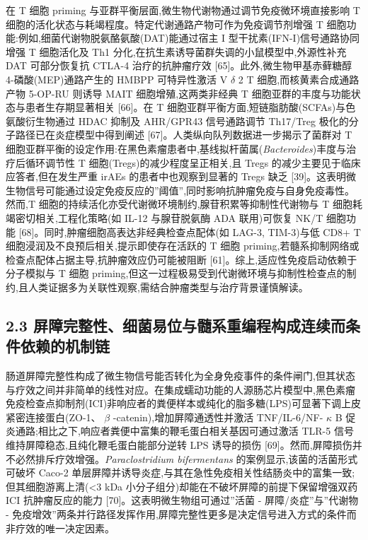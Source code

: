 \documentclass[11pt]{article}
\begin{document}
在 T 细胞 priming 与亚群平衡层面,微生物代谢物通过调节免疫微环境直接影响 T 细胞的活化状态与耗竭程度。特定代谢通路产物可作为免疫调节剂增强 T 细胞功能:例如,细菌代谢物脱氨酪氨酸(DAT)能通过宿主 I 型干扰素(IFN-I)信号通路协同增强 T 细胞活化及 Th1 分化,在抗生素诱导菌群失调的小鼠模型中,外源性补充 DAT 可部分恢复抗 CTLA-4 治疗的抗肿瘤疗效 {[}65{]}。此外,微生物甲基赤藓糖醇 4-磷酸(MEP)通路产生的 HMBPP 可特异性激活 V \(\delta\) 2 T 细胞,而核黄素合成通路产物 5-OP-RU 则诱导 MAIT 细胞增殖,这两类非经典 T 细胞亚群的丰度与功能状态与患者生存期显著相关 {[}66{]}。在 T 细胞亚群平衡方面,短链脂肪酸(SCFAs)与色氨酸衍生物通过 HDAC 抑制及 AHR/GPR43 信号通路调节 Th17/Treg 极化的分子路径已在炎症模型中得到阐述 {[}67{]}。人类纵向队列数据进一步揭示了菌群对 T 细胞亚群平衡的设定作用:在黑色素瘤患者中,基线拟杆菌属(\emph{Bacteroides})丰度与治疗后循环调节性 T 细胞(Tregs)的减少程度呈正相关,且 Tregs 的减少主要见于临床应答者,但在发生严重 irAEs 的患者中也观察到显著的 Tregs 缺乏 {[}39{]}。这表明微生物信号可能通过设定免疫反应的''阈值'',同时影响抗肿瘤免疫与自身免疫毒性。然而,T 细胞的持续活化亦受代谢微环境制约,腺苷积累等抑制性代谢物与 T 细胞耗竭密切相关,工程化策略(如 IL-12 与腺苷脱氨酶 ADA 联用)可恢复 NK/T 细胞功能 {[}68{]}。同时,肿瘤细胞高表达非经典检查点配体(如 LAG-3, TIM-3)与低 CD8+ T 细胞浸润及不良预后相关,提示即使存在活跃的 T 细胞 priming,若髓系抑制网络或检查点配体占据主导,抗肿瘤效应仍可能被阻断 {[}61{]}。综上,适应性免疫启动依赖于分子模拟与 T 细胞 priming,但这一过程极易受到代谢微环境与抑制性检查点的制约,且人类证据多为关联性观察,需结合肿瘤类型与治疗背景谨慎解读。

\subsection{2.3 屏障完整性、细菌易位与髓系重编程构成连续而条件依赖的机制链}\label{ux5c4fux969cux5b8cux6574ux6027ux7ec6ux83ccux6613ux4f4dux4e0eux9ad3ux7cfbux91cdux7f16ux7a0bux6784ux6210ux8fdeux7eedux800cux6761ux4ef6ux4f9dux8d56ux7684ux673aux5236ux94fe}

肠道屏障完整性构成了微生物信号能否转化为全身免疫事件的条件闸门,但其状态与疗效之间并非简单的线性对应。在集成蠕动功能的人源肠芯片模型中,黑色素瘤免疫检查点抑制剂(ICI)非响应者的粪便样本或纯化的脂多糖(LPS)可显著下调上皮紧密连接蛋白(ZO-1、 \(\beta\) -catenin),增加屏障通透性并激活 TNF/IL-6/NF- \(\kappa\) B 促炎通路;相比之下,响应者粪便中富集的鞭毛蛋白相关基因可通过激活 TLR-5 信号维持屏障稳态,且纯化鞭毛蛋白能部分逆转 LPS 诱导的损伤 {[}69{]}。然而,屏障损伤并不必然排斥疗效增强。\emph{Paraclostridium bifermentans} 的案例显示,该菌的活菌形式可破坏 Caco-2 单层屏障并诱导炎症,与其在急性免疫相关性结肠炎中的富集一致;但其细胞游离上清(\textless3 kDa 小分子组分)却能在不破坏屏障的前提下保留增强双药 ICI 抗肿瘤反应的能力 {[}70{]}。这表明微生物组可通过''活菌 - 屏障/炎症''与''代谢物 - 免疫增效''两条并行路径发挥作用,屏障完整性更多是决定信号进入方式的条件而非疗效的唯一决定因素。
\end{document}
